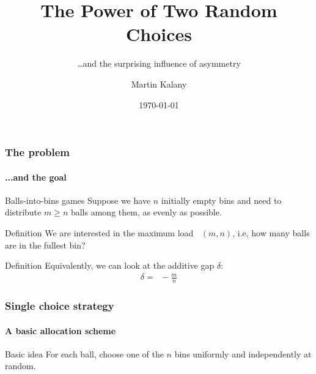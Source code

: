 \documentclass[professionalfonts]{beamer}
\title{The Power of Two Random Choices}
\subtitle{\dots and the surprising influence of asymmetry}
\author[M. Kalany]{Martin Kalany}
\institute[TU Wien]
{
  Graduate student in Computer Science\\
  Vienna University of Technology\\
}
\date{\today}
\DeclareMathOperator{\load}{L_{\max}} %
\newcommand\scalefac{0.55}
\newcommand\ballsize{5mm}
\newcommand\nrbins{6}
\newcommand\padding{0.1*\ballsize}
\newcommand\bingap{1.6*\balldiameter}
\newcommand\balldiameter{2*\ballsize}
\newcommand\iA[2][0]{
	\path (\nbid) edge[insert, bend left=#1] (#2);
}
\newcommand\bin[1]{
	\path node[topflat, xshift=#1*\bingap*\scalefac, above, yshift=-\padding*\scalefac]  {};
}
\newcommand\bins{
	\foreach \ibin in {1,...,\nrbins}
		\bin{\ibin};
}
\newcommand\setNode[2]{
	\draw let \n1 ={#1#2} in node[circle, minimum size = \ballsize](n\n1) at (#1*\bingap,#2*\balldiameter-\ballsize) {};
}
\newcommand\nodes{
	\foreach \i in {1,...,6}
		\foreach \j in {1,...,5}
			\setNode{\i}{\j};
}
\newcommand\ball[2]{
	\shade[ballstyle] (#1*\bingap,#2*\balldiameter-\ballsize) circle (\ballsize) {};
}
\newcommand\nbid{nb}
\newcommand\newball{
	\draw node[circle, minimum size = \ballsize](\nbid) at (0*\bingap,6*\balldiameter-\ballsize) {};
	\ball{0}{6};
}
\newcommand\putinbin[2]{
	\ifnum #2 > 0
		\foreach \nrballs in {1,...,#2}
 			\ball{#1}{\nrballs};
 	\fi
}
\newcounter{index}
\newcommand\balls[1]{%
	\getargsC{#1}%
  	\setcounter{index}{0}%
  	\whiledo{\theindex < \narg}{%
    		\stepcounter{index}%
    		\putinbin{\theindex}{\csname arg\romannumeral\theindex\endcsname}%
  	}%
}
\newcommand\bab[1]{%
	\bins
	\nodes
	\balls{#1}
}
\begin{document}
\begin{frame}
  \titlepage
\end{frame}

\begin{frame}
\frametitle{The problem}
\framesubtitle{...and the goal}
\begin{alertblock}{Balls-into-bins games}
Suppose we have $n$ initially empty bins and need to distribute $m \geq n$ balls
among them, \alert{as evenly as possible}. 
\end{alertblock}
\pause
\begin{exampleblock}{Definition}
We are interested in the \alert{maximum load $\load(m,n)$}, i.e, how many balls are in the fullest bin?
\end{exampleblock}

\begin{exampleblock}{Definition}
Equivalently, we can look at the \alert{additive gap} $\delta$:
\begin{align*}
\delta = \load - \frac{m}{n}
\end{align*}
\end{exampleblock}
\end{frame}

\begin{frame}
\frametitle{Single choice strategy}
\framesubtitle{A basic allocation scheme}
\begin{exampleblock}{Basic idea}
For each ball, choose one of the $n$ bins \alert{uniformly and independently at random}.
\end{exampleblock}
\bigskip

\begin{center}
\end{center}
\end{frame}
\end{document}
